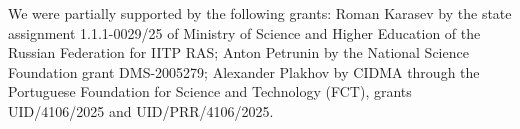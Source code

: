 \documentclass[a4paper,10pt]{article}
\begin{document}
We were partially supported by the following grants:
Roman Karasev by the state assignment 1.1.1-0029/25 of Ministry of Science and Higher Education of the Russian Federation for IITP RAS;
Anton Petrunin by the National Science Foundation grant DMS-2005279;
Alexander Plakhov by CIDMA through the Portuguese Foundation for Science and Technology (FCT), grants UID/4106/2025 and UID/PRR/4106/2025.

{\sloppy
\def\emph{\textit}
\printbibliography[heading=bibintoc]
\fussy
}

\Addresses
\end{document}
